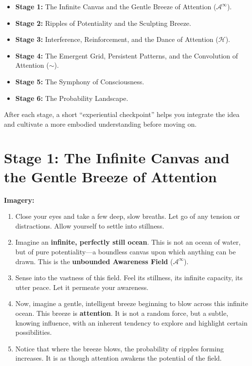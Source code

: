 \documentclass[12pt,a4paper]{article}
\begin{document}
\begin{itemize}
    \item \textbf{Stage 1:} The Infinite Canvas and the Gentle Breeze of Attention (\(\mathscr{A}^\infty\)).
    \item \textbf{Stage 2:} Ripples of Potentiality and the Sculpting Breeze.
    \item \textbf{Stage 3:} Interference, Reinforcement, and the Dance of Attention (\(\mathcal{H}\)).
    \item \textbf{Stage 4:} The Emergent Grid, Persistent Patterns, and the Convolution of Attention (\(\sim\)).
    \item \textbf{Stage 5:} The Symphony of Consciousness.
    \item \textbf{Stage 6:} The Probability Landscape.
\end{itemize}

After each stage, a short ``experiential checkpoint'' helps you integrate the idea and cultivate a more embodied understanding before moving on.

\section*{Stage 1: The Infinite Canvas and the Gentle Breeze of Attention}

\textbf{Imagery:}
\begin{enumerate}
    \item Close your eyes and take a few deep, slow breaths. Let go of any tension or distractions. Allow yourself to settle into stillness.
    \item Imagine an \textbf{infinite, perfectly still ocean}. This is not an ocean of water, but of pure potentiality—a boundless canvas upon which anything can be drawn. This is the \textbf{unbounded Awareness Field} (\(\mathscr{A}^\infty\)).
    \item Sense into the vastness of this field. Feel its stillness, its infinite capacity, its utter peace. Let it permeate your awareness.
    \item Now, imagine a gentle, intelligent breeze beginning to blow across this infinite ocean. This breeze is \textbf{attention}. It is not a random force, but a subtle, knowing influence, with an inherent tendency to explore and highlight certain possibilities.
    \item Notice that where the breeze blows, the probability of ripples forming increases. It is as though attention awakens the potential of the field.
\end{enumerate}
\end{document}
